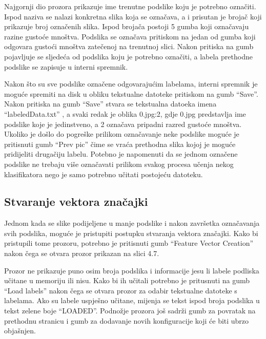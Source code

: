 \documentclass[times, utf8, zavrsni]{fer}
\begin{document}
\newpage

Najgornji dio prozora prikazuje ime trenutne podslike koju je potrebno označiti.
Ispod naziva se nalazi konkretna slika koja se označava, a i prisutan je brojač
koji prikazuje broj označenih slika. Ispod brojača postoji 5 gumba koji
označavaju razine gustoće mnoštva. Podslika se označava pritiskom na jedan
od gumba koji odgovara gustoći mnoštva zatečenoj na trenutnoj slici. Nakon pritiska
na gumb pojavljuje se sljedeća od podslika koju je potrebno označiti, a labela
prethodne podslike se zapisuje u interni spremnik. 

\bigbreak

Nakon što su sve podslike označene
odgovarajućim labelama, interni spremnik je moguće spremiti na disk u obliku 
tekstualne datoteke pritiskom na gumb \enquote{Save}. Nakon pritiska na gumb
\enquote{Save} stvara se tekstualna datoeka imena \enquote{labeledData.txt}
, a svaki redak je oblika 0.jpg:2, gdje 0.jpg predstavlja ime podslike koje 
je jedinstveno, a 2 označava pripadni razred gustoće mnoštva. Ukoliko je 
došlo do pogreške prilikom označavanje neke podslike moguće je pritisnuti
gumb \enquote{Prev pic} čime se vraća prethodna slika kojoj je moguće pridijeliti
drugačiju labelu. Potebno je napomenuti da se jednom označene podslike ne trebaju 
više označavati prilikom svakog procesa učenja nekog klasifikatora nego 
je samo potrebno učitati postojeću datoteku.

\subsection{Stvaranje vektora značajki}

Jednom kada se slike podijeljene u manje podslike i nakon završetka označavanja
svih podslika, moguće je pristupiti postupku stvaranja vektora značajki. 
Kako bi pristupili tome prozoru, potrebno je pritisnuti gumb \enquote{Feature Vector Creation} 
nakon čega se otvara prozor prikazan na slici 4.7.

Prozor ne prikazuje puno osim broja podslika i informacije jesu li labele
podliska učitane u memoriju ili nisu. Kako bi ih učitali potrebno je pritusnuti
na gumb \enquote{Load labels} nakon čega se otvara prozor za odabir tekstualne datoteke
s labelama. Ako su labele uspješno učitane, mijenja se tekst ispod broja
podslika u tekst zelene boje \enquote{LOADED}. Podnožje prozora još sadrži gumb
za povratak na prethodnu stranicu i gumb za dodavanje novih konfiguracije koji će biti
ubrzo objašnjen. 
\end{document}
